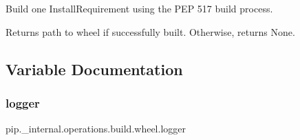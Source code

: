 \begin{DoxyVerb}Build one InstallRequirement using the PEP 517 build process.

Returns path to wheel if successfully built. Otherwise, returns None.
\end{DoxyVerb}
 

\subsection{Variable Documentation}
\mbox{\label{namespacepip_1_1__internal_1_1operations_1_1build_1_1wheel_a70bfdf51c1b6129956d5dc1d16032a61}} 
\subsubsection{\texorpdfstring{logger}{logger}}
{\footnotesize\ttfamily pip.\+\_\+internal.\+operations.\+build.\+wheel.\+logger}

